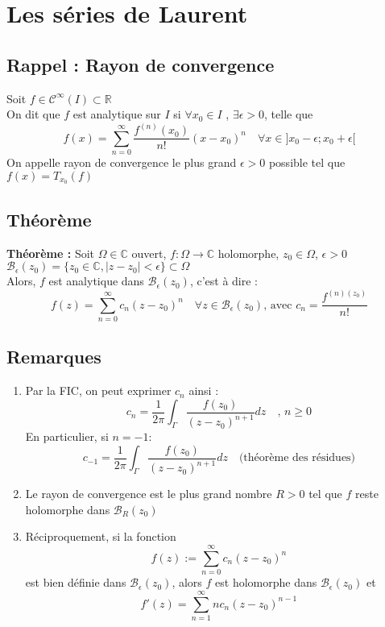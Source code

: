 \section{Les séries de Laurent}
\subsection{Rappel : Rayon de convergence}
Soit $f\in\mathcal{C}^{\infty}(I)\subset\mathbb{R}$\\
On dit que $f$ est analytique sur $I$ si $\forall x_0 \in I$ , $\exists \epsilon > 0$, telle que
$$f(x) = \sum_{n=0}^{\infty}\frac{f^{(n)}(x_0)}{n!}(x-x_0)^n \quad \forall x \in ]x_0-\epsilon;x_0+\epsilon[$$
On appelle rayon de convergence le plus grand $\epsilon > 0$ possible tel que $f(x) = T_{x_0}(f)$

\subsection{Théorème}
\textbf{Théorème :} Soit $\Omega\in\mathbb{C}$ ouvert, $f : \Omega\to\mathbb{C}$ holomorphe, $z_0\in\Omega$, $\epsilon>0$\\
$\mathcal{B}_{\epsilon}(z_0) = \{z_0\in\mathbb{C}, |z-z_0|<\epsilon\}\subset\Omega$\\
Alors, $f$ est analytique dans $\mathcal{B}_\epsilon(z_0)$, c'est à dire :
$$f(z) = \sum_{n=0}^{\infty}c_n(z-z_0)^n \quad \forall z \in \mathcal{B}_\epsilon(z_0) \text{, avec } c_n = \frac{f^{(n)(z_0)}}{n!}$$

\subsection{Remarques}
\begin{enumerate}
    \item Par la FIC, on peut exprimer $c_n$ ainsi :
    $$c_n = \frac{1}{2\pi}\int_{\Gamma}\frac{f(z_0)}{(z-z_0)^{n+1}}dz \quad \text{, }n\geq0$$
    En particulier, si $n=-1 :$
    $$c_{-1}=\frac{1}{2\pi}\int_{\Gamma}\frac{f(z_0)}{(z-z_0)^{n+1}}dz \quad \text{(théorème des résidues)}$$
    \item Le rayon de convergence est le plus grand nombre $R > 0$ tel que $f$ reste holomorphe dans $\mathcal{B}_R(z_0)$
    \item Réciproquement, si la fonction
    $$f(z) := \sum_{n=0}^{\infty}c_n(z-z_0)^n$$
    est bien définie dans $\mathcal{B}_\epsilon(z_0)$, alors $f$ est holomorphe dans $\mathcal{B}_\epsilon(z_0)$ et
    $$f'(z) = \sum_{n=1}^{\infty}nc_n(z-z_0)^{n-1}$$
\end{enumerate}

